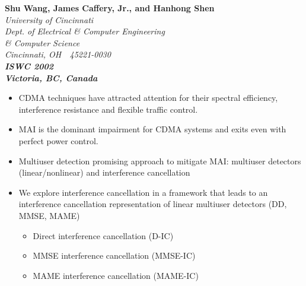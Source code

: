 \documentclass[25pt,landscape]{foils}
\begin{document}
\raggedright

\color{white}
\pagecolor{bgcolor} %
\pagecolor{bgblue}



\begin{center}
\vspace{0.8in}
{\large \bf Shu Wang, James Caffery, Jr., and Hanhong Shen} \vspace{1em} \\
{\it University of Cincinnati \\ Dept. of Electrical \& Computer
Engineering \\ \& Computer Science \\ Cincinnati,
OH~~45221-0030 \vspace{2em} \\
{\bf ISWC 2002 \\ Victoria, BC, Canada}}
\end{center}

\begin{itemize}
\item CDMA techniques have attracted attention for their
spectral efficiency, interference resistance and flexible traffic
control.
\item MAI is the dominant impairment for CDMA systems and exits even with
perfect power control.
\item Multiuser detection promising approach to mitigate MAI:
multiuser detectors (linear/nonlinear) and interference cancellation
\item We explore interference cancellation in a framework that leads to an
interference cancellation representation of linear multiuser detectors (DD,
MMSE, MAME)
 \begin{itemize}
 \item Direct interference cancellation (D-IC)
 \item MMSE interference cancellation (MMSE-IC)
 \item MAME interference cancellation (MAME-IC)
 \end{itemize}
\end{itemize}
\end{document}
